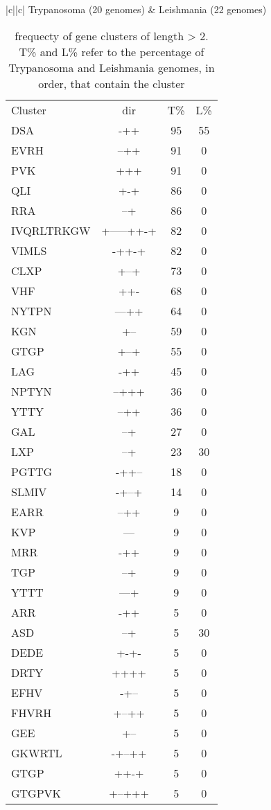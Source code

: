 \documentclass[table,
12pt, %
a4paper, %
oneside, %
headinclude,footinclude, %
BCOR5mm, %
]{scrartcl}
\begin{document}
\begin{table}[htbp]
\caption{frequecty of gene clusters of length > 2. T\% and L\% refer to the percentage of Trypanosoma and Leishmania genomes, in order, that contain the cluster}
\begin{adjustbox}{totalheight=\textheight,center}
\begin{tabular}{|c||c|} \hline
Trypanosoma (20 genomes) & Leishmania (22 genomes)\\ \hline\hline
\begin{tabular}{l ccc}
Cluster&dir& T\%&L\%\\
DSA&-++&95&55\\
EVRH&--++&91&0\\
PVK&+++&91&0\\
QLI&+-+&86&0\\
RRA&--+&86&0\\
IVQRLTRKGW&+-----++-+&82&0\\
VIMLS&-++-+&82&0\\
CLXP&+--+&73&0\\
VHF&++-&68&0\\
NYTPN&---++&64&0\\
KGN&+--&59&0\\
GTGP&+--+&55&0\\
LAG&-++&45&0\\
NPTYN&--+++&36&0\\
YTTY&--++&36&0\\
GAL&--+&27&0\\
LXP&--+&23&30\\
PGTTG&-++--&18&0\\
SLMIV&-+--+&14&0\\
EARR&--++&9&0\\
KVP&---&9&0\\
MRR&-++&9&0\\
TGP&--+&9&0\\
YTTT&---+&9&0\\
ARR&-++&5&0\\
ASD&--+&5&30\\
DEDE&+-+-&5&0\\
DRTY&++++&5&0\\
EFHV&-+--&5&0\\
FHVRH&+--++&5&0\\
GEE&+--&5&0\\
GKWRTL&-+--++&5&0\\
GTGP&++-+&5&0\\
GTGPVK&+--+++&5&0\\

\end{tabular}
\end{tabular}
\end{adjustbox}
\end{table}
\end{document}
